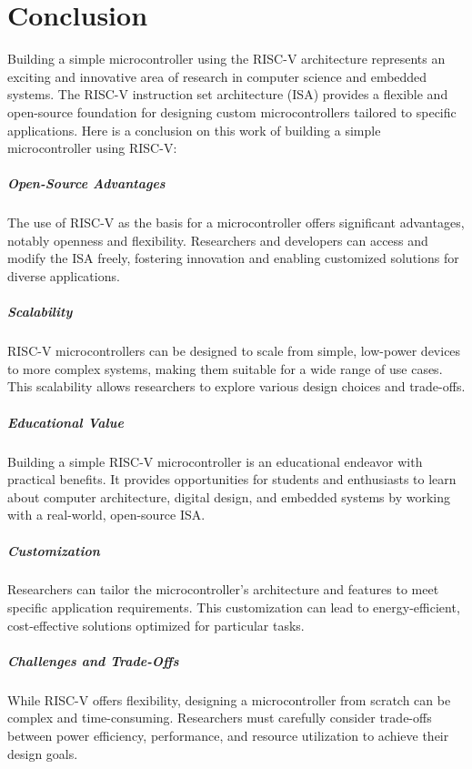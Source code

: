 \chapter{Conclusion}
Building a simple microcontroller using the RISC-V architecture represents an exciting and innovative area of 
research in computer science and embedded systems. 
The RISC-V instruction set architecture (ISA) provides a flexible and open-source foundation for designing 
custom microcontrollers tailored to specific applications. 
Here is a conclusion on this work of building a simple microcontroller using RISC-V:

\paragraph*{Open-Source Advantages}
The use of RISC-V as the basis for a microcontroller offers significant advantages, notably openness and flexibility. Researchers and developers can access and modify the ISA freely, fostering innovation and enabling customized solutions for diverse applications.
\paragraph*{Scalability}
RISC-V microcontrollers can be designed to scale from simple, low-power devices to more complex systems, making them suitable for a wide range of use cases. This scalability allows researchers to explore various design choices and trade-offs.
\paragraph*{Educational Value}
Building a simple RISC-V microcontroller is an educational endeavor with practical benefits. It provides opportunities for students and enthusiasts to learn about computer architecture, digital design, and embedded systems by working with a real-world, open-source ISA.
\paragraph*{Customization}
Researchers can tailor the microcontroller's architecture and features to meet specific application requirements. This customization can lead to energy-efficient, cost-effective solutions optimized for particular tasks.
\paragraph*{Challenges and Trade-Offs}
While RISC-V offers flexibility, designing a microcontroller from scratch can be complex and time-consuming. Researchers must carefully consider trade-offs between power efficiency, performance, and resource utilization to achieve their design goals.

